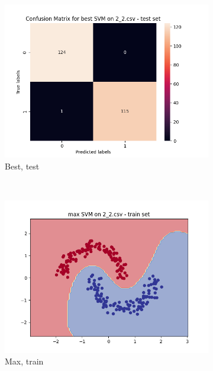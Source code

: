 \documentclass[12pt]{article}
\newcommand*{\subfigwidth}{0.24\textwidth}
\begin{document}
\begin{figure}[H]
\begin{subfigure}[t]{\subfigwidth}
        \includegraphics[width=\linewidth]{img/exp_2/svm/2_2/best/test_matrix.png}
        \caption{Best, test}
    \end{subfigure} 
    \\
    \begin{subfigure}[t]{\subfigwidth}
        \includegraphics[width=\linewidth]{img/exp_2/svm/2_2/max/train_boundary.png}
        \caption{Max, train}
    \end{subfigure}
    \hfill
    \begin{subfigure}[t]{\subfigwidth}

\end{subfigure}
\end{figure}
\end{document}
